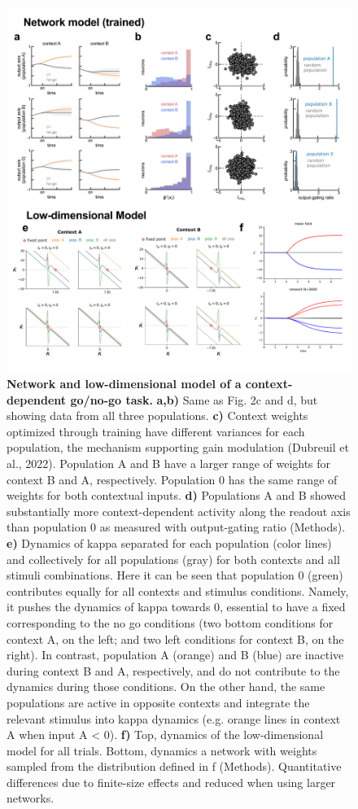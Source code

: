 \documentclass[12pt]{article}
\begin{document}
\begin{figure}
\centering
        \includegraphics[width=\textwidth]{figures/FigS2.pdf}
    \caption{\textbf{Network and low-dimensional model of a context-dependent go/no-go task.} \textbf{a,b)} Same as Fig. 2c and d, but showing data from all three populations. \textbf{c)} Context weights optimized through training have different variances for each population, the mechanism supporting gain modulation (Dubreuil et al., 2022). Population A and B have a larger range of weights for context B and A, respectively. Population 0 has the same range of weights for both contextual inputs. \textbf{d)} Populations A and B showed substantially more context-dependent activity along the readout axis than population 0 as measured with output-gating ratio (Methods). \textbf{e)} Dynamics of kappa separated for each  population (color lines) and collectively for all populations (gray) for both contexts and all stimuli combinations. Here it can be seen that population 0 (green) contributes equally for all contexts and stimulus conditions. Namely, it pushes the dynamics of kappa towards 0, essential to have a fixed corresponding to the no go conditions (two bottom conditions for context A, on the left; and two left conditions for context B, on the right). In contrast, population A (orange) and B (blue) are inactive during context B and A, respectively, and do not contribute to the dynamics during those conditions. On the other hand, the same populations are active in opposite contexts and integrate the relevant stimulus into kappa dynamics (e.g. orange lines in context A when input A < 0). \textbf{f)} Top, dynamics of the low-dimensional model for all trials. Bottom, dynamics a network with weights sampled from the distribution defined in f (Methods). Quantitative differences due to finite-size effects and reduced when using larger networks. } 
    \label{figS2}
\end{figure}
\end{document}

